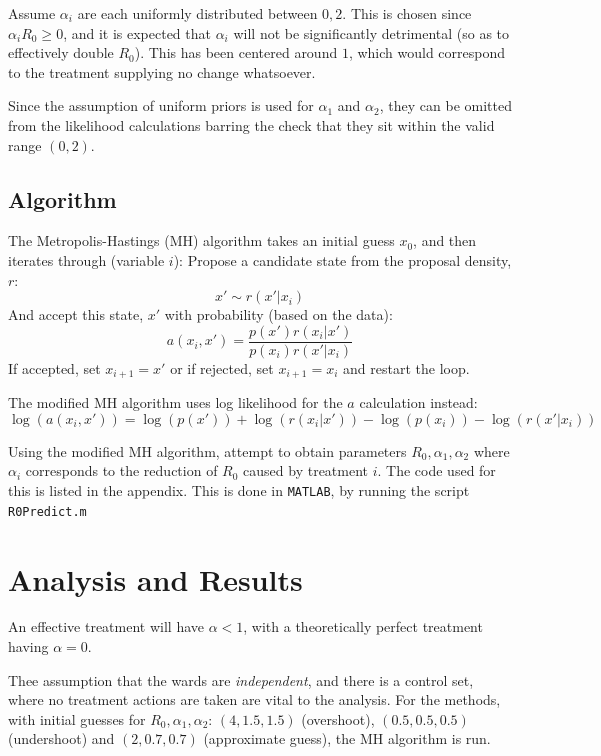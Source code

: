 \documentclass{X:/Documents/Coding/Latex/myassignment}
\begin{document}
Assume $\alpha_i$ are each uniformly distributed between $0,2$. This is chosen since $\alpha_i R_0 \geq 0$, and it is expected that $\alpha_i$ will not be significantly detrimental (so as to effectively double $R_0$). This has been centered around $1$, which would correspond to the treatment supplying no change whatsoever.

Since the assumption of uniform priors is used for $\alpha_1$ and $\alpha_2$, they can be omitted from the likelihood calculations barring the check that they sit within the valid range $(0,2)$.


\subsection{Algorithm}
The Metropolis-Hastings (MH) algorithm takes an initial guess $x_0$, and then iterates through (variable $i$):
Propose a candidate state from the proposal density, $r$:
\[x' \sim r(x'|x_i)\]
And accept this state, $x'$ with probability (based on the data):
\[a(x_i,x') = \frac{p(x')r(x_i|x')}{p(x_i)r(x'|x_i)}\]
If accepted, set $x_{i+1} = x'$ or if rejected, set $x_{i+1} = x_i$ and restart the loop. 

The modified MH algorithm uses log likelihood for the $a$ calculation instead:
\[\log(a(x_i,x')) = \log(p(x')) + \log(r(x_i|x')) - \log(p(x_i)) - \log(r(x'|x_i)) \]



Using the modified MH algorithm, attempt to obtain parameters $R_0, \alpha_1, \alpha_2$ where $\alpha_i$ corresponds to the reduction of $R_0$ caused by treatment $i$. The code used for this is listed in the appendix.
This is done in \verb|MATLAB|, by running the script \verb|R0Predict.m|











\section{Analysis and Results}
 An effective treatment will have $\alpha < 1$, with a theoretically perfect treatment having $\alpha = 0$.  

Thee assumption that the wards are \emph{independent}, and there is a control set, where no treatment actions are taken are vital to the analysis. 
For the methods, with initial guesses for $R_0,\alpha_1,\alpha_2$: $(4,1.5,1.5)$ (overshoot), $(0.5,0.5,0.5)$ (undershoot) and $(2,0.7,0.7)$ (approximate guess), the MH algorithm is run. 
\end{document}

